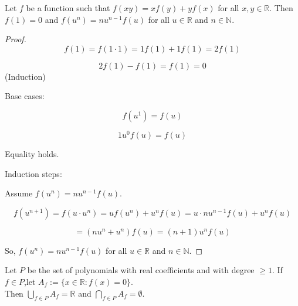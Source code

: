 \documentclass[12pt]{article}
\begin{document}
\vfill
\begin{Lemma}
Let $f$ be a function such that $f(x y)=x f(y)+y f(x)$ for all $x, y \in \mathbb{R}
$. Then $f(1)=0$ and $f\left(u^{n}\right)=n u^{n-1} f(u)$ for all $u \in \mathbb{R}
$ and $n \in \mathbb{N}$.
\end{Lemma}
\begin{proof}
\[
f(1) = f(1\cdot1) = 1f(1)+1f(1) = 2f(1)
\]

\[
2f(1) - f(1) = f(1) = 0
\]
(Induction)

Base cases: 

\[
f(u^1) = f(u)
\]

\[
1u^{0}f(u) = f(u)
\]

Equality holds.

Induction steps:

Assume $f\left(u^{n}\right)=n u^{n-1} f(u)$.

\[
f(u^{n+1}) = f(u\cdot u^n) = uf(u^n)+u^nf(u) = u \cdot nu^{n-1}f(u)+u^nf(u)
\]

\[
=(nu^n+u^n)f(u) = (n+1)u^nf(u)
\]

So, $f\left(u^{n}\right)=n u^{n-1} f(u)$ for all $u \in \mathbb{R}
$ and $n \in \mathbb{N}$.
\end{proof}
\vfill
\begin{Lemma}
Let $P$ be the set of polynomials with real coefficients and with degree $\geq
1$. If $f \in P$,let $A_{f}:=\{x \in \mathbb{R}: f(x)=0\}$.\\
Then $\bigcup\limits_{f \in P} A_{f}=\mathbb{R}$ and $\bigcap\limits_{f \in P}
A_{f}=\emptyset$.
\end{Lemma}
\end{document}

